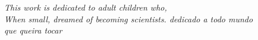 
\begin{dedicatoria}

    \vspace*{\fill}
    \centering
    \noindent
    \textit{\lang
    {
        This work is dedicated to adult children who, \\
        When small, dreamed of becoming scientists.
    }
    {
        dedicado a todo mundo  \\
        que queira tocar
    }}
    \vspace*{\fill}

\end{dedicatoria}


